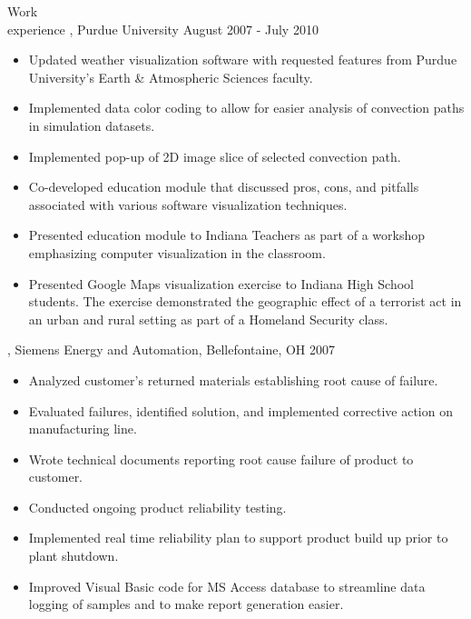 \begin{category}{Work \\experience}
, Purdue University  August 2007 - July 2010 
\begin{itemize}
\item Updated weather visualization software with requested features from Purdue University's Earth \& Atmospheric Sciences faculty.
\item Implemented data color coding to allow for easier analysis of convection paths in simulation datasets.
\item Implemented pop-up of 2D image slice of selected convection path. %
\item Co-developed education module that discussed pros, cons, and pitfalls associated with various software visualization techniques.
\item Presented education module to Indiana Teachers as part of a workshop emphasizing computer visualization in the classroom.
\item Presented Google Maps visualization exercise to Indiana High School students. The exercise demonstrated the geographic effect of a terrorist act in an urban and rural setting as part of a Homeland Security class.
\end{itemize}

, Siemens Energy and Automation, Bellefontaine, OH  2007 
\begin{itemize}
\item Analyzed customer's returned materials establishing root cause of failure.
\item Evaluated failures, identified solution, and implemented corrective action on manufacturing line.
\item Wrote technical documents reporting root cause failure of product to customer.
\item Conducted ongoing product reliability testing.
\item Implemented real time reliability plan to support product build up prior to plant shutdown.
\item Improved Visual Basic code for MS Access database to streamline data logging of samples and to make report generation easier.
\end{itemize}


\end{category}
